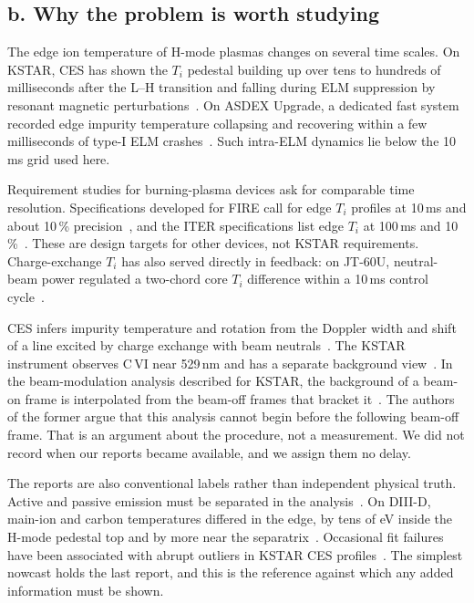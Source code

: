\subsection*{b. Why the problem is worth studying}
The edge ion temperature of H-mode plasmas changes on several time scales. On KSTAR, CES has shown the $T_i$ pedestal building up over tens to hundreds of milliseconds after the L--H transition and falling during ELM suppression by resonant magnetic perturbations~\citep{Ko2015IonTemperature}. On ASDEX Upgrade, a dedicated fast system recorded edge impurity temperature collapsing and recovering within a few milliseconds of type-I ELM crashes~\citep{Viezzer2018IonHeat}. Such intra-ELM dynamics lie below the 10\,ms grid used here.

Requirement studies for burning-plasma devices ask for comparable time resolution. Specifications developed for FIRE call for edge $T_i$ profiles at 10\,ms and about 10\,\% precision~\citep{Young2008PlasmaMeasurements}, and the ITER specifications list edge $T_i$ at 100\,ms and 10\,\%~\citep{Donne2007ChapterDiagnostics}. These are design targets for other devices, not KSTAR requirements. Charge-exchange $T_i$ has also served directly in feedback: on JT-60U, neutral-beam power regulated a two-chord core $T_i$ difference within a 10\,ms control cycle~\citep{Yoshida2009RealTime}.

CES infers impurity temperature and rotation from the Doppler width and shift of a line excited by charge exchange with beam neutrals~\citep{Fonck1984DeterminationPlasma}. The KSTAR instrument observes C\,VI near 529\,nm and has a separate background view~\citep{Ko2010ChargeExchange}. In the beam-modulation analysis described for KSTAR, the background of a beam-on frame is interpolated from the beam-off frames that bracket it~\citep{Lee2020TwoGaussian,Lee2026NeuralNetworkbased}. The authors of the former argue that this analysis cannot begin before the following beam-off frame. That is an argument about the procedure, not a measurement. We did not record when our reports became available, and we assign them no delay.

The reports are also conventional labels rather than independent physical truth. Active and passive emission must be separated in the analysis~\citep{Viezzer2011PassiveEdge}. On DIII-D, main-ion and carbon temperatures differed in the edge, by tens of eV inside the H-mode pedestal top and by more near the separatrix~\citep{Haskey2018MainIon}. Occasional fit failures have been associated with abrupt outliers in KSTAR CES profiles~\citep{Kim2024KineticProfile}. The simplest nowcast holds the last report, and this is the reference against which any added information must be shown.

